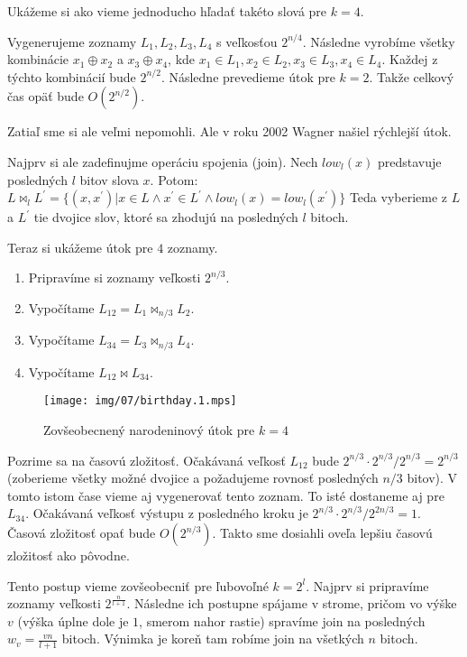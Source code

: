 Ukážeme si ako vieme jednoducho hľadať takéto slová pre $k=4$.

Vygenerujeme zoznamy $L_1, L_2, L_3, L_4$ s veľkosťou $2^{n/4}$. 
Následne vyrobíme všetky kombinácie $x_1 \oplus x_2$ a $x_3 \oplus x_4$, kde
$x_1 \in L_1, x_2 \in L_2, x_3 \in L_3, x_4 \in L_4$.
Každej z týchto kombinácií bude $2^{n/2}$. Následne prevedieme útok pre $k=2$.
Takže celkový čas opäť bude $O(2^{n/2})$.

Zatiaľ sme si ale veľmi nepomohli. Ale v roku 2002 Wagner \cite{birthday}
našiel rýchlejší útok.

Najprv si ale zadefinujme operáciu spojenia (join). Nech $low_l(x)$ predstavuje
posledných $l$ bitov slova $x$. Potom:
$L \bowtie_l L^{'} = \{(x, x^{'}) | x \in L \land x^{'} \in L^{'} \land low_{l}(x) = low_l(x^{'})\}$
Teda vyberieme z $L$ a $L^{'}$ tie dvojice slov, ktoré sa zhodujú na posledných
$l$ bitoch.

Teraz si ukážeme útok pre $4$ zoznamy. 
\begin{enumerate}
\item Pripravíme si zoznamy veľkosti $2^{n/3}$.
\item Vypočítame $L_{12} = L_1 \bowtie_{n/3} L_2$.
\item Vypočítame $L_{34} = L_3 \bowtie_{n/3} L_4$.
\item Vypočítame $L_{12} \bowtie L_{34}$.
\end{enumerate}

\begin{figure}
    \centering
    \texttt{[image: img/07/birthday.1.mps]}
    \caption{Zovšeobecnený narodeninový útok pre $k = 4$}
\end{figure}


Pozrime sa na časovú zložitosť. Očakávaná veľkosť $L_{12}$ bude $2^{n/3} \cdot 2^{n/3} / 2^{n/3} = 2^{n/3}$ (zoberieme všetky možné
dvojice a požadujeme rovnosť posledných $n/3$ bitov). V tomto istom čase vieme aj vygenerovať tento zoznam. To isté
dostaneme aj pre $L_{34}$. Očakávaná veľkosť výstupu z posledného kroku je $2^{n/3} \cdot 2^{n/3} / 2^{2n/3} = 1$.
Časová zložitosť opať bude $O(2^{n/3})$. Takto sme dosiahli oveľa lepšiu časovú zložitosť ako pôvodne.

Tento postup vieme zovšeobecniť pre ľubovoľné $k = 2^l$. 
Najprv si pripravíme zoznamy veľkosti $2^{\frac{n}{l+1}}$. Následne ich postupne spájame v strome, pričom
vo výške $v$ (výška úplne dole je $1$, smerom nahor rastie) spravíme join na posledných $w_v = \frac{vn}{l + 1}$
bitoch. Výnimka je koreň tam robíme join na všetkých $n$ bitoch.

